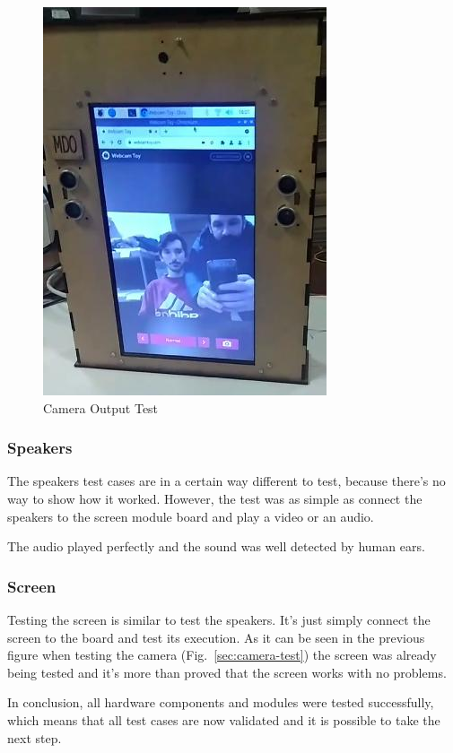 \begin{figure}[!htb]
    \includegraphics[width=.45\textwidth]{img/camera-teste.jpg}%
  \caption{Camera Output Test}%
  \label{fig:camera-test}
  \end{figure}
  
\subsubsection{Speakers}
\label{sec:speakers-test}

The speakers test cases are in a certain way different to test, because there's no way to show how it worked. However, the test was as simple as connect the speakers to the screen module board and play a video or an audio.

The audio played perfectly and the sound was well detected by human ears.

\subsubsection{Screen}
\label{sec:screen-test}

Testing the screen is similar to test the speakers. It's just simply connect the screen to the board and test its execution. As it can be seen in the previous figure when testing the camera (Fig.~\ref{sec:camera-test}) the screen was already being tested and it's more than proved that the screen works with no problems.


In conclusion, all hardware components and modules were tested successfully, which means that all test cases are now validated and it is possible to take the next step.
